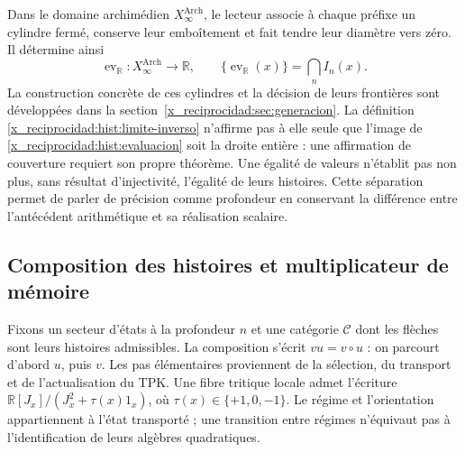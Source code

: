 Dans le domaine archimédien \(X_\infty^{\mathrm{Arch}}\), le lecteur associe
à chaque préfixe un cylindre fermé, conserve leur emboîtement et fait tendre
leur diamètre vers zéro. Il détermine ainsi
\begin{equation}
 \operatorname{ev}_{\mathbb R}:X_\infty^{\mathrm{Arch}}\longrightarrow
 \mathbb R,\qquad
 \{\operatorname{ev}_{\mathbb R}(x)\}=\bigcap_n I_n(x).
 \label{x_reciprocidad:hist:evaluacion}
\end{equation}
La construction concrète de ces cylindres et la décision de leurs frontières
sont développées dans la section~\ref{x_reciprocidad:sec:generacion}. La définition
\eqref{x_reciprocidad:hist:limite-inverso} n’affirme pas à elle seule que l’image de
\eqref{x_reciprocidad:hist:evaluacion} soit la droite entière : une affirmation de couverture
requiert son propre théorème. Une égalité de valeurs n’établit pas non plus, sans
résultat d’injectivité, l’égalité de leurs histoires. Cette séparation
permet de parler de précision comme profondeur en conservant la différence
entre l’antécédent arithmétique et sa réalisation scalaire.

\subsection{Composition des histoires et multiplicateur de mémoire}
\label{x_reciprocidad:hist:algebra}

Fixons un secteur d’états à la profondeur \(n\) et une catégorie
\(\mathcal C\) dont les flèches sont leurs histoires admissibles. La composition
s’écrit \(vu=v\circ u\) : on parcourt d’abord \(u\), puis \(v\).
Les pas élémentaires proviennent de la sélection, du transport et de
l’actualisation du TPK. Une fibre tritique locale admet l’écriture
\(\mathbb R[J_x]/(J_x^2+\tau(x)1_x)\), où
\(\tau(x)\in\{+1,0,-1\}\). Le régime et l’orientation appartiennent à
l’état transporté ; une transition entre régimes n’équivaut pas à
l’identification de leurs algèbres quadratiques.

